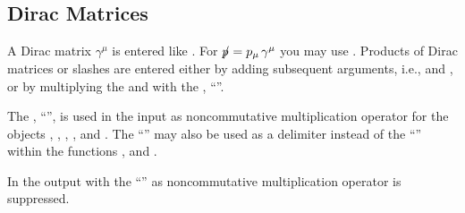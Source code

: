 \subsection{Dirac Matrices}

A Dirac matrix $\gamma^{\mu}$ is entered like .
For  $p \hspace{-1.5mm} / = p_{\mu} \, \gamma^{\mu}$ you may use
. Products of Dirac matrices or slashes are
entered either by adding subsequent arguments, i.e.,
 and
, or by multiplying the
 and  with the \mma {}, ``''.


The \mma {}, ``'', is used in the input as noncommutative
multiplication operator for the objects ,
, , , 
and .
The ``'' may also be used as a delimiter instead of the ``\mb{,}''
within the functions ,  and
.

In the output with  the ``''
as noncommutative multiplication operator
is suppressed.

